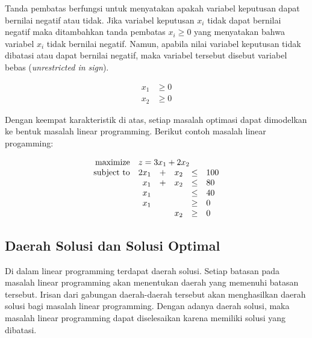\begin{itemize}
		Tanda pembatas berfungsi untuk menyatakan apakah variabel keputusan dapat bernilai negatif atau tidak. Jika variabel keputusan \(x_i\) tidak dapat bernilai negatif maka ditambahkan tanda pembatas \(x_i \geq 0\) yang menyatakan bahwa variabel \(x_i\) tidak bernilai negatif. Namun, apabila nilai variabel keputusan tidak dibatasi atau dapat bernilai negatif, maka variabel tersebut disebut variabel bebas (\textit{unrestricted in sign}).
		
		\begin{equation*}
			\begin{split}
    			x_1 &\geq 0 \\
    			x_2 &\geq 0
			\end{split}
		\end{equation*}
		
\end{itemize}

Dengan keempat karakteristik di atas, setiap masalah optimasi dapat dimodelkan ke bentuk masalah linear programming. Berikut contoh masalah linear progamming:

\begin{equation*}
	\begin{array}{r r c r c l}
		\text{maximize} &\multicolumn{5}{l}{z = 3x_1 + 2x_2}\\
		\text{subject to} &2x_1 &+ &x_2 &\leq &100\\
		&x_1 &+ &x_2 &\leq &80\\
		&x_1 &&&\leq &40\\
		&x_1 &&&\geq &0\\
		&&&x_2 &\geq &0\\
	\end{array}
\end{equation*}

\subsection{Daerah Solusi dan Solusi Optimal}
\label{daerah_solusi_dan_solusi_optimal}

Di dalam linear programming terdapat daerah solusi. Setiap batasan pada masalah linear programming akan menentukan daerah yang memenuhi batasan tersebut. Irisan dari gabungan daerah-daerah tersebut akan menghasilkan daerah solusi bagi masalah linear programming. Dengan adanya daerah solusi, maka masalah linear programming dapat diselesaikan karena memiliki solusi yang dibatasi.



